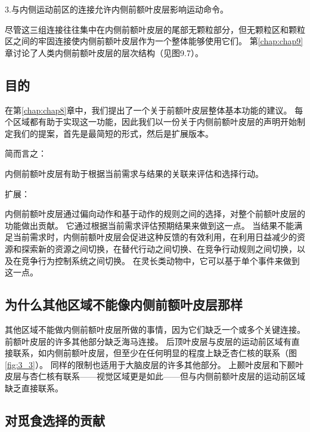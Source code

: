 3.与内侧运动前区的连接允许内侧前额叶皮层影响运动命令。\par

尽管这三组连接往往集中在内侧前额叶皮层的尾部无颗粒部分，但无颗粒区和颗粒区之间的牢固连接使内侧前额叶皮层作为一个整体能够使用它们。
第\ref{chap:chap9}章讨论了人类内侧前额叶皮层的层次结构（见图9.7）。\par



\subsection{目的}

在第\ref{chap:chap8}章中，我们提出了一个关于前额叶皮层整体基本功能的建议。
每个区域都有助于实现这一功能，因此我们以一份关于内侧前额叶皮层的声明开始制定我们的提案，首先是最简短的形式，然后是扩展版本。\par


简而言之：\par
内侧前额叶皮层有助于根据当前需求与结果的关联来评估和选择行动。\par
扩展：\par
内侧前额叶皮层通过偏向动作和基于动作的规则之间的选择，对整个前额叶皮层的功能做出贡献。
它通过根据当前需求评估预期结果来做到这一点。
当结果不能满足当前需求时，内侧前额叶皮层会促进这种反馈的有效利用，在利用日益减少的资源和探索新的资源之间切换，在替代行动之间切换、在竞争行动规则之间切换，以及在竞争行为控制系统之间切换。
在灵长类动物中，它可以基于单个事件来做到这一点。\par



\subsection{为什么其他区域不能像内侧前额叶皮层那样}

其他区域不能做内侧前额叶皮层所做的事情，因为它们缺乏一个或多个关键连接。
前额叶皮层的许多其他部分缺乏海马连接。
后顶叶皮层与皮层的运动前区域有直接联系，如内侧前额叶皮层，但至少在任何明显的程度上缺乏杏仁核的联系（图\ref{fig:3_3}）。
同样的限制也适用于大脑皮层的许多其他部分。
上颞叶皮层和下颞叶皮层与杏仁核有联系——视觉区域更是如此——但与内侧前额叶皮层的运动前区域缺乏直接联系。\par



\subsection{对觅食选择的贡献}


